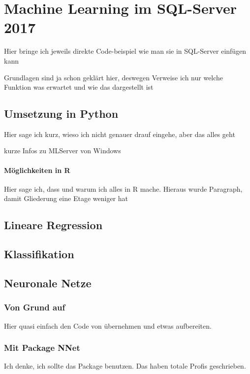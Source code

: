 \section{Machine Learning im SQL-Server 2017}
\label{sec:MLSQL}
Hier bringe ich jeweils direkte Code-beispiel wie man sie in SQL-Server einfügen kann

Grundlagen sind ja schon geklärt hier, deswegen Verweise ich nur welche Funktion was erwartet und wie das dargestellt ist
\subsection{Umsetzung in Python}
Hier sage ich kurz, wieso ich nicht genauer drauf eingehe, aber das alles geht

kurze Infos zu MLServer von Windows
\paragraph{Möglichkeiten in  R}
Hier sage ich, dass und warum ich alles in R mache. 
Hieraus wurde Paragraph, damit Gliederung eine Etage weniger hat
\subsection{Lineare Regression}
\subsection{Klassifikation}
\subsection{Neuronale Netze}
\subsubsection{Von Grund auf}
Hier quasi einfach den Code von \cite{SelbyNN} übernehmen und etwas aufbereiten.
\subsubsection{Mit Package NNet}
Ich denke, ich sollte das Package benutzen. Das haben totale Profis geschrieben. 